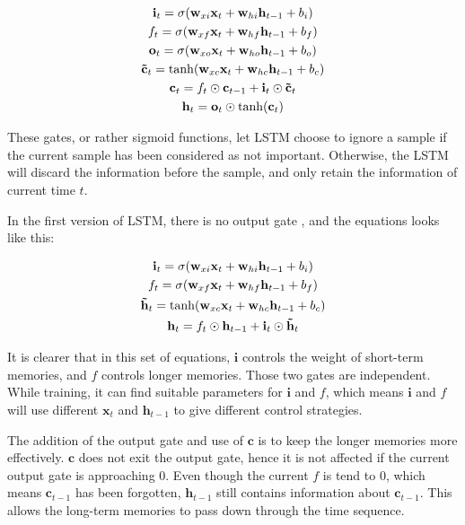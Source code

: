 \begin{gather}
    \mathbf{i} _t=\sigma (\mathbf{w} _{xi}\mathbf{x} _t + \mathbf{w} _{hi}\mathbf{h} _{t-1} + b_i) \notag\\
    f_t=\sigma (\mathbf{w} _{xf}\mathbf{x} _t + \mathbf{w} _{hf}\mathbf{h} _{t-1} + b_f) \notag\\
    \mathbf{o} _t=\sigma (\mathbf{w} _{xo}\mathbf{x} _t + \mathbf{w} _{ho}\mathbf{h} _{t-1} + b_o) \notag\\
    \mathbf{\tilde{c} } _t=\tanh (\mathbf{w} _{xc}\mathbf{x} _t + \mathbf{w} _{hc}\mathbf{h} _{t-1} + b_c) \\
    \mathbf{c} _t=f_t \odot \mathbf{c} _{t-1} + \mathbf{i} _t \odot \mathbf{\tilde{c} } _t \notag\\
    \mathbf{h} _t=\mathbf{o} _t \odot \tanh (\mathbf{c} _t) \notag
\end{gather}

These gates, or rather sigmoid functions, let LSTM choose to ignore a sample if the current sample has been considered as not important. 
Otherwise, the LSTM will discard the information before the sample, and only retain the information of current time $t$. 

In the first version of LSTM, there is no output gate \cite{ribeiro2020exploding}, and the equations looks like this: 

\begin{gather}
    \mathbf{i} _t=\sigma (\mathbf{w} _{xi}\mathbf{x} _t + \mathbf{w} _{hi}\mathbf{h} _{t-1} + b_i) \notag\\
    f_t=\sigma (\mathbf{w} _{xf}\mathbf{x} _t + \mathbf{w} _{hf}\mathbf{h} _{t-1} + b_f) \notag\\
    \mathbf{\tilde{h} } _t=\tanh (\mathbf{w} _{xc}\mathbf{x} _t + \mathbf{w} _{hc}\mathbf{h} _{t-1} + b_c) \\
    \mathbf{h} _t=f_t \odot \mathbf{h} _{t-1} + \mathbf{i} _t \odot \mathbf{\tilde{h} } _t \notag
\end{gather}

It is clearer that in this set of equations, $\mathbf{i}$ controls the weight of short-term memories, and $f$ controls longer memories. 
Those two gates are independent. While training, it can find suitable parameters for $\mathbf{i}$ and $f$, 
which means $\mathbf{i}$ and $f$  will use different $\mathbf{x} _t$ and $\mathbf{h} _{t-1}$ to give different control strategies.

The addition of the output gate and use of $\mathbf{c}$ is to keep the longer memories more effectively. 
$\mathbf{c}$ does not exit the output gate, hence it is not affected if the current output gate is approaching 0. 
Even though the current $f$ is tend to 0, which means $\mathbf{c}_{t-1}$ has been forgotten, $\mathbf{h} _{t-1}$ still contains information about $\mathbf{c}_{t-1}$. 
This allows the long-term memories to pass down through the time sequence. 

